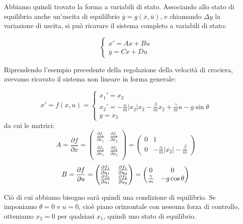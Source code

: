 \documentclass[a4paper,11pt]{article}
\begin{document}
Abbiamo quindi trovato la forma a variabili di stato.
Associando allo stato di equilibrio anche un'uscita di equililbrio $\overline{y} = g(\overline{x}, \overline{u})$, e chiamando $\Delta y$ la variazione di uscita, si può ricavare il sistema completo a variabili di stato:

\[
	\begin{cases}
		x' = Ax + Bu \\ 
		y = Cx + Du
	\end{cases}
\]

\par\smallskip 

Riprendendo l'esempio precedente della regolazione della velocità di crociera, avevamo ricavato il sistema non lineare in forma generale:

$$
x' = f(x, u) = 
	\begin{cases}
		x_1' = x_2 \\
		x_2' = -\frac{\alpha}{m} |x_2| x_2 - \frac{\beta}{m} x_2 + \frac{\gamma}{m} u - g \sin{\theta} \\ 
		y = x_2
	\end{cases}
$$
da cui le matrici:
$$
A = \frac{\partial f}{\partial x} = \begin{pmatrix}
	\frac{\partial f_1}{\partial x_1} & \frac{\partial f_1}{\partial x_2} \\ 
	\frac{\partial f_2}{\partial x_1} & \frac{\partial f_2}{\partial x_2} \\ 
\end{pmatrix} = \begin{pmatrix}
	0 & 1 \\ 
	0 & -\frac{\alpha}{m}|\overline{x_2}| - \frac{\beta}{m}
\end{pmatrix}
$$
$$
B = \frac{\partial f}{\partial u} = \begin{pmatrix}
	\frac{\partial f_1}{\partial u_1} & \frac{\partial f_1}{\partial u_2} \\ 
	\frac{\partial f_2}{\partial u_1} & \frac{\partial f_2}{\partial u_2} \\ 
\end{pmatrix} = \begin{pmatrix}
	0 & 0 \\ 
	\frac{\gamma}{m} & -g\cos{\theta} 
\end{pmatrix} \\
$$

Ciò di cui abbiamo bisogno sarà quindi una condizione di equilibrio.
Se imponiamo $\theta = 0$ e $u = 0$, cioè piano orizzontale con nessuna forza di controllo, otteniamo $x_2 = 0$ per qualsiasi $x_1$, quindi uno stato di equilibrio.
\end{document}
